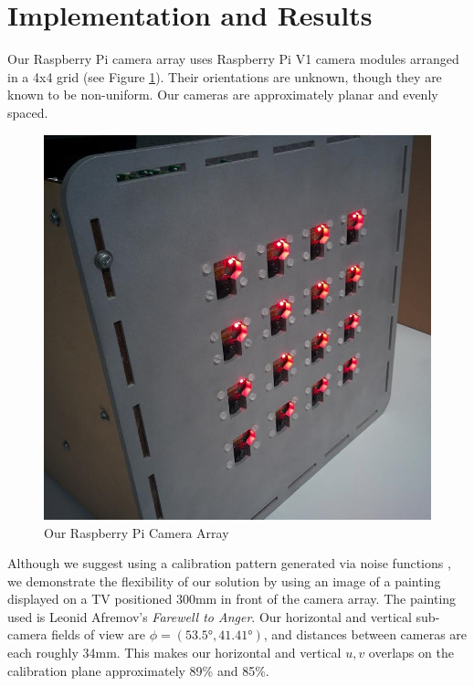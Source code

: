 \documentclass{article} \usepackage{acra}
\begin{document}

\section{Implementation and Results}

Our Raspberry Pi camera array uses Raspberry Pi V1 camera modules arranged in a
4x4 grid (see Figure \ref{fig:rpi_camera_array}). Their orientations are
unknown, though they are known to be non-uniform. Our cameras are approximately
planar and evenly spaced.

\begin{figure}[H] \centering
  \includegraphics[width=0.8\linewidth]{images/rpicam}
  \caption{Our Raspberry Pi Camera Array}
  \label{fig:rpi_camera_array}
\end{figure}

Although we suggest using a calibration pattern generated via noise functions
\cite{li_multiple-camera_2013}, we demonstrate the flexibility of our solution
by using an image of a painting displayed on a TV positioned 300mm in front of
the camera array. The painting used is Leonid Afremov's \emph{Farewell to
  Anger}. Our horizontal and vertical sub-camera fields of view are
$\phi=(\ang{53.5}, \ang{41.41})$, and distances between cameras are each roughly
34mm. This makes our horizontal and vertical $u,v$ overlaps on the calibration
plane approximately 89\% and 85\%.
\end{document}
